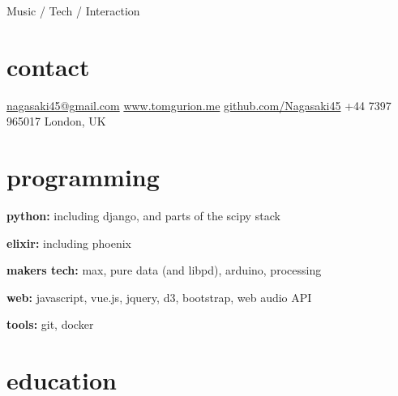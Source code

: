\documentclass[]{friggeri-cv}  %
\begin{document}
       {Music / Tech / Interaction}


\begin{aside}

\section{contact}

\href{mailto:nagasaki45@gmail.com}{nagasaki45@gmail.com}
\href{http://www.tomgurion.me}{www.tomgurion.me}
\href{https://github.com/Nagasaki45}{github.com/Nagasaki45}
+44 7397 965017
London, UK

\section{programming}

\textbf{python:} including django, and parts of the scipy stack

\textbf{elixir:} including phoenix

\textbf{makers tech:} max, pure data (and libpd), arduino, processing

\textbf{web:} javascript, vue.js, jquery, d3, bootstrap, web audio API

\textbf{tools:} git, docker

\end{aside}


\section{education}
\end{document}
